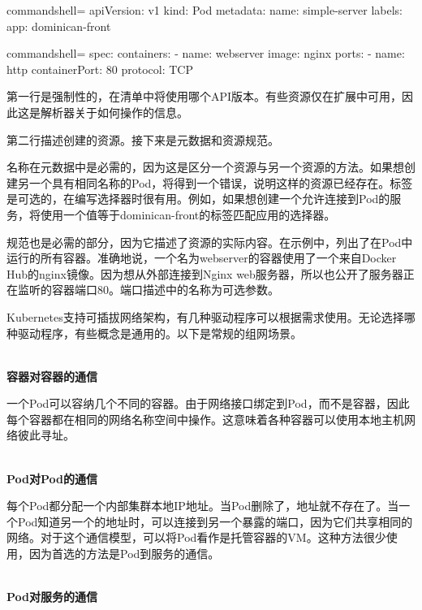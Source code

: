 \begin{tcblisting}{commandshell={}}
apiVersion: v1
kind: Pod
metadata:
  name: simple-server
  labels:
    app: dominican-front
\end{tcblisting}
\begin{tcblisting}{commandshell={}}
spec:
  containers:
    - name: webserver
      image: nginx
      ports:
        - name: http
          containerPort: 80
          protocol: TCP
\end{tcblisting}

第一行是强制性的，在清单中将使用哪个API版本。有些资源仅在扩展中可用，因此这是解析器关于如何操作的信息。 

第二行描述创建的资源。接下来是元数据和资源规范。

名称在元数据中是必需的，因为这是区分一个资源与另一个资源的方法。如果想创建另一个具有相同名称的Pod，将得到一个错误，说明这样的资源已经存在。标签是可选的，在编写选择器时很有用。例如，如果想创建一个允许连接到Pod的服务，将使用一个值等于dominican-front的标签匹配应用的选择器。

规范也是必需的部分，因为它描述了资源的实际内容。在示例中，列出了在Pod中运行的所有容器。准确地说，一个名为webserver的容器使用了一个来自Docker Hub的nginx镜像。因为想从外部连接到Nginx web服务器，所以也公开了服务器正在监听的容器端口80。端口描述中的名称为可选参数。


Kubernetes支持可插拔网络架构，有几种驱动程序可以根据需求使用。无论选择哪种驱动程序，有些概念是通用的。以下是常规的组网场景。

\hspace*{\fill} \\ %
\noindent
\textbf{容器对容器的通信}

一个Pod可以容纳几个不同的容器。由于网络接口绑定到Pod，而不是容器，因此每个容器都在相同的网络名称空间中操作。这意味着各种容器可以使用本地主机网络彼此寻址。

\hspace*{\fill} \\ %
\noindent
\textbf{Pod对Pod的通信}

每个Pod都分配一个内部集群本地IP地址。当Pod删除了，地址就不存在了。当一个Pod知道另一个的地址时，可以连接到另一个暴露的端口，因为它们共享相同的网络。对于这个通信模型，可以将Pod看作是托管容器的VM。这种方法很少使用，因为首选的方法是Pod到服务的通信。

\hspace*{\fill} \\ %
\noindent
\textbf{Pod对服务的通信}

